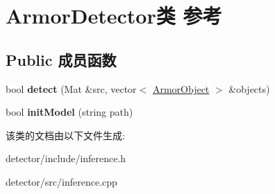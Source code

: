 \hypertarget{class_armor_detector}{}\section{Armor\+Detector类 参考}
\label{class_armor_detector}
\subsection*{Public 成员函数}
\begin{DoxyCompactItemize}
\item 
\mbox{\label{class_armor_detector_ab71ebdc57106aaf985e2f91467bd35c5}} 
bool {\bfseries detect} (Mat \&src, vector$<$ \hyperlink{struct_armor_object}{Armor\+Object} $>$ \&objects)
\item 
\mbox{\label{class_armor_detector_a2772a5e8bcce3f60eec274af2071faaf}} 
bool {\bfseries init\+Model} (string path)
\end{DoxyCompactItemize}


该类的文档由以下文件生成\+:\begin{DoxyCompactItemize}
\item 
detector/include/inference.\+h\item 
detector/src/inference.\+cpp\end{DoxyCompactItemize}

